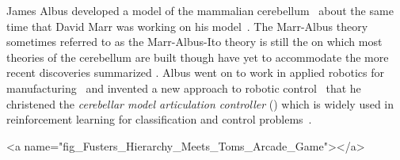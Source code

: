 James Albus developed a model of the mammalian cerebellum~\cite{AlbusMB-71} about the same time that David Marr was working on his model~\cite{MarrJoP-69}. The Marr-Albus theory {\emdash{}} sometimes referred to as the Marr-Albus-Ito theory {\emdash{}} is still the {} on which most theories of the cerebellum are built {\emdash{}} though have yet to accommodate the more recent discoveries summarized {}. Albus went on to work in applied robotics for manufacturing~\cite{AlbusetalSME-84} and invented a new approach to robotic control~\cite{Albus75} that he christened the {\it{cerebellar model articulation controller}} ({}) which is widely used in reinforcement learning for classification and control problems~\cite{ShewchukPhD}.


\setcounter{figure}{16}

              
\rawhtml
<a name="fig_Fusters_Hierarchy_Meets_Toms_Arcade_Game"></a>
\endrawhtml


